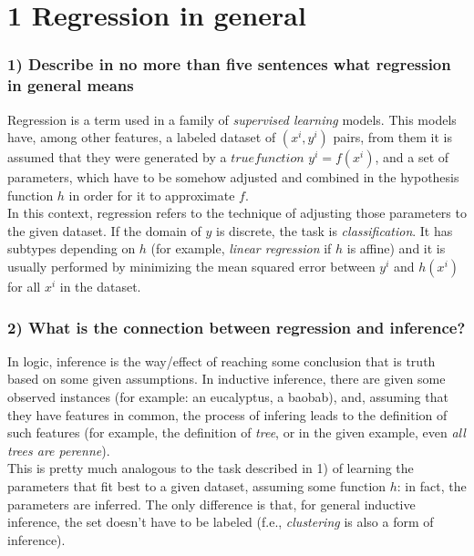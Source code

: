 \documentclass[11pt]{scrartcl} %
\begin{document}
         \vspace{5mm}
         \section*{1 Regression in general}
         \subsubsection*{1) Describe in no more than five sentences what regression in general means}
         Regression is a term used in a family of {\it supervised learning} models. This models have, among other features, a labeled dataset of \((x^i, y^i)\) pairs, from them it is assumed that they were generated by a \(true function\) \(y^i = f(x^i)\), and a set of parameters, which have to be somehow adjusted and combined in the hypothesis function \(h\) in order for it to approximate \(f\).\\
         
         In this context, regression refers to the technique of adjusting those parameters to the given dataset. If the domain of \(y\) is discrete, the task is {\it classification}. It has subtypes depending on \(h\) (for example, {\it linear regression} if \(h\) is affine) and it is usually performed by minimizing the mean squared error between \(y^i\) and \(h(x^i)\) for all \(x^i\) in the dataset.

         \subsubsection*{2) What is the connection between regression and inference?}
         In logic, inference is the way/effect of reaching some conclusion that is truth based on some given assumptions. In inductive inference, there are given some observed instances (for example: an eucalyptus, a baobab), and, assuming that they have features in common, the process of infering leads to the definition of such features (for example, the definition of {\it tree}, or in the given example, even {\it all trees are perenne}).\\

         This is pretty much analogous to the task described in 1) of learning the parameters that fit best to a given dataset, assuming some function \(h\): in fact, the parameters are inferred. The only difference is that, for general inductive inference, the set doesn't have to be labeled (f.e., {\it clustering} is also a form of inference).
         
\end{document}
